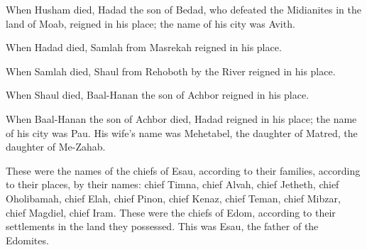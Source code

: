 {\par }{\PP {}When Husham
died,
Hadad
the son
of Bedad,
who defeated
the Midianites
in the land
of Moab,
reigned in his place; the name
of his city
was Avith.
\par }{\PP {}When Hadad
died,
Samlah
from Masrekah
reigned
in his place.
\par }{\PP {}When Samlah
died,
Shaul
from Rehoboth
by the River
reigned
in his place.
\par }{\PP {}When Shaul
died,
Baal-Hanan
the son
of Achbor
reigned
in his place.
\par }{\PP {}When Baal-Hanan
the son
of Achbor
died,
Hadad
reigned
in his place;
the name
of his city
was Pau.
His wife’s
name
was Mehetabel,
the daughter
of Matred,
the daughter
of Me-Zahab.
\par }{\PP {}These
were the names
of the chiefs
of Esau,
according to their families,
according to their places,
by their names: chief
Timna,
chief
Alvah,
chief
Jetheth,
chief
Oholibamah,
chief
Elah,
chief
Pinon,
chief
Kenaz,
chief
Teman,
chief
Mibzar,
chief
Magdiel,
chief
Iram.
These
were the chiefs
of Edom,
according to their settlements in
the land
they possessed.
This was
Esau,
the father
of the Edomites.

}
